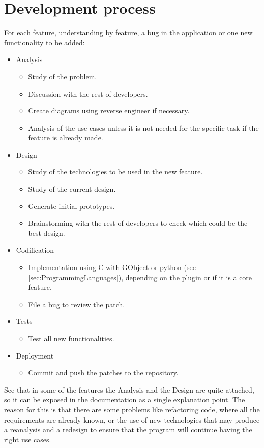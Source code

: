 
\chapter{Development process}


For each feature, understanding by feature, a bug in the application or one new functionality to be added:

\begin{itemize}
  \item Analysis
    \begin{itemize}
      \item Study of the problem.
      \item Discussion with the rest of developers.
      \item Create diagrams using reverse engineer if necessary.
      \item Analysis of the use cases unless it is not needed for the specific task if the feature is already made.
    \end{itemize}
  \item Design
    \begin{itemize}
      \item Study of the technologies to be used in the new feature.
      \item Study of the current design.
      \item Generate initial prototypes.
      \item Brainstorming with the rest of developers to check which could be the best design.
    \end{itemize}
  \item Codification
    \begin{itemize}
      \item Implementation using C with GObject or python (see \ref{sec:ProgrammingLanguages}), depending on the plugin or if it is a core feature.
      \item File a bug to review the patch.
    \end{itemize}
  \newpage
  \item Tests
    \begin{itemize}
      \item Test all new functionalities.
    \end{itemize}
  \item Deployment
    \begin{itemize}
      \item Commit and push the patches to the \GNOME repository.
    \end{itemize}
\end{itemize}

See that in some of the features the Analysis and the Design are quite attached, so it can be exposed in the documentation as a single explanation point. The reason for this is that there are some problems like refactoring code, where all the requirements are already known, or the use of new technologies that may produce a reanalysis and a redesign to ensure that the program will continue having the right use cases.

